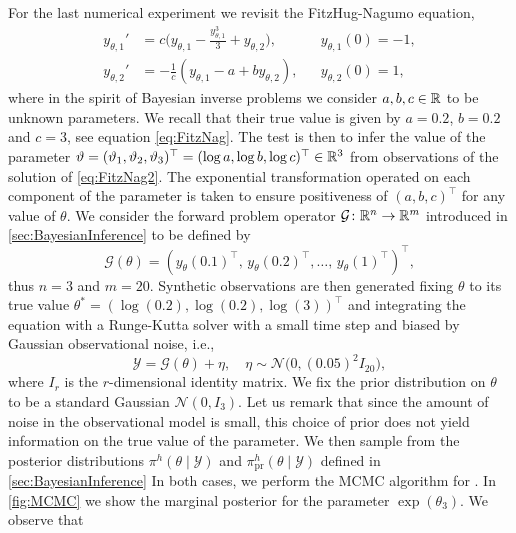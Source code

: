 \documentclass[final,onefignum,onetabnum]{siamonline171218}
\begin{document}
For the last numerical experiment we revisit the FitzHug-Nagumo equation,
\begin{equation}\label{eq:FitzNag2}
\begin{aligned}
y_{\theta, 1}' &= c\big(y_{\theta, 1} - \frac{y_{\theta, 1}^3}{3} + y_{\theta, 2}\big), && y_{\theta, 1}(0) = -1, \\
y_{\theta, 2}' &= -\frac{1}{c}(y_{\theta, 1} - a + b y_{\theta, 2}), && y_{\theta, 2}(0) = 1,
\end{aligned}
\end{equation}
where in the spirit of Bayesian inverse problems we consider $a, b, c \in \mathbb{R}$ to be unknown parameters. We recall that their true value is given by $a = 0.2$, $b = 0.2$ and $c = 3$, see equation \eqref{eq:FitzNag}. The test is then to infer the value of the parameter $\vartheta = (\vartheta_1, \vartheta_2, \vartheta_3)^\top = (\log a, \log b, \log c)^\top \in \mathbb{R}^3$ from observations of the solution of \eqref{eq:FitzNag2}. The exponential transformation operated on each component of the parameter is taken to ensure positiveness of $(a, b, c)^\top$ for any value of $\theta$.  We consider the forward problem operator $\mathcal{G} \colon \mathbb{R}^n \to \mathbb{R}^m$ introduced in \cref{sec:BayesianInference} to be defined by
\begin{equation}
	\mathcal{G}(\theta) = (y_\theta(0.1)^\top,\, y_\theta(0.2)^\top, \ldots,\, y_\theta(1)^\top)^\top,
\end{equation} 
thus $n = 3$ and $m = 20$. Synthetic observations are then generated fixing $\theta$ to its true value $\theta^* = (\log(0.2), \log(0.2), \log(3))^\top$ and integrating the equation with a Runge-Kutta solver with a small time step and biased by Gaussian observational noise, i.e.,
\begin{equation}
	\mathcal{Y} = \mathcal{G}(\theta) + \eta, \quad \eta \sim \mathcal{N}\big(0, (0.05)^2 I_{20}\big),
\end{equation}
where $I_{r}$ is the $r$-dimensional identity matrix. We fix the prior distribution on $\theta$ to be a standard Gaussian $\mathcal{N}(0, I_3)$. Let us remark that since the amount of noise in the observational model is small, this choice of prior does not yield information on the true value of the parameter. We then sample from the posterior distributions $\pi^h(\theta \mid \mathcal Y)$ and $\pi^h_{\mathrm{pr}}(\theta \mid \mathcal Y)$ defined in \cref{sec:BayesianInference}  In both cases, we perform the MCMC algorithm for . In \cref{fig:MCMC} we show the marginal posterior for the parameter $\exp(\theta_3)$. We observe that 
\end{document}
